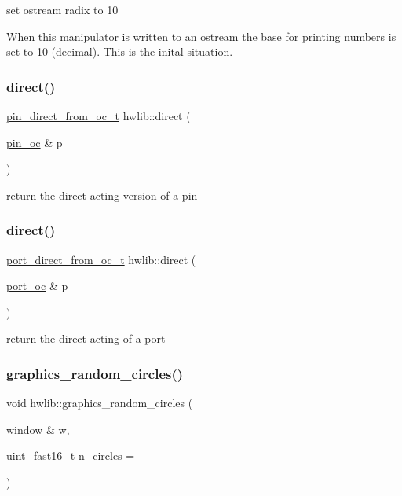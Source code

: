set ostream radix to 10

When this manipulator is written to an ostream the base for printing numbers is set to 10 (decimal). This is the inital situation. \mbox{\label{namespacehwlib_a43941b7f246ad934ee43dbfa0f5c8b5a}} 
\subsubsection{\texorpdfstring{direct()}{direct()}\hspace{0.1cm}{\footnotesize\ttfamily [1/2]}}
{\footnotesize\ttfamily \hyperlink{classhwlib_1_1pin__direct__from__oc__t}{pin\+\_\+direct\+\_\+from\+\_\+oc\+\_\+t} hwlib\+::direct (\begin{DoxyParamCaption}\item[{\hyperlink{classhwlib_1_1pin__oc}{pin\+\_\+oc} \&}]{p }\end{DoxyParamCaption})}

return the direct-\/acting version of a pin \mbox{\label{namespacehwlib_a68091f0a605af40f86570f100909f6b5}} 
\subsubsection{\texorpdfstring{direct()}{direct()}\hspace{0.1cm}{\footnotesize\ttfamily [2/2]}}
{\footnotesize\ttfamily \hyperlink{classhwlib_1_1port__direct__from__oc__t}{port\+\_\+direct\+\_\+from\+\_\+oc\+\_\+t} hwlib\+::direct (\begin{DoxyParamCaption}\item[{\hyperlink{classhwlib_1_1port__oc}{port\+\_\+oc} \&}]{p }\end{DoxyParamCaption})}

return the direct-\/acting of a port \mbox{\label{namespacehwlib_a1adc4e1384730a5ea80a1db07a4b22ae}} 
\subsubsection{\texorpdfstring{graphics\+\_\+random\+\_\+circles()}{graphics\_random\_circles()}}
{\footnotesize\ttfamily void hwlib\+::graphics\+\_\+random\+\_\+circles (\begin{DoxyParamCaption}\item[{\hyperlink{classhwlib_1_1window}{window} \&}]{w,  }\item[{uint\+\_\+fast16\+\_\+t}]{n\+\_\+circles = {} }\end{DoxyParamCaption})}

